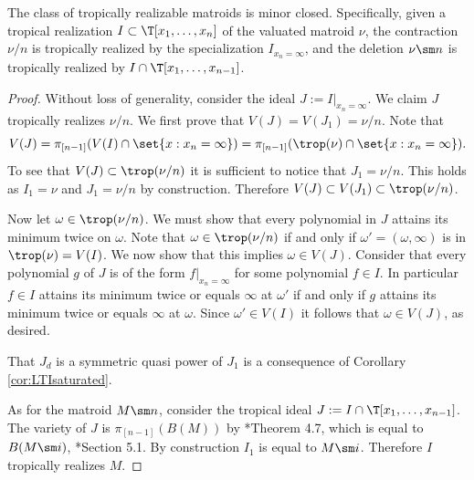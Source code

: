 \begin{theorem}\label{thm:minorClosed}
The class of tropically realizable matroids is minor closed. Specifically, given a tropical realization $I\subset \T[x_1,\dots,x_n]$ of the valuated matroid $\nu$, the contraction $\nu/n$ is tropically realized by the specialization $I_{x_n=\infty}$, and the deletion $\nu\sm n$ is tropically realized by $I\cap\T[x_1,\dots,x_{n-1}]$.
\end{theorem}
\begin{proof}
Without loss of generality, consider the ideal $J:= I|_{x_n=\infty}$. We claim $J$ tropically realizes $\nu/n$. We first prove that $V(J) = V(J_1)=\nu/n$. Note that
$$V(J)= \pi_{[n-1]}(V(I)\cap \set{x: x_n = \infty}) = \pi_{[n-1]}(\trop(\nu)\cap\set{x: x_n=\infty}).$$
To see that $V(J)\subset \trop(\nu/n)$ it is sufficient to notice that $J_1 = \nu/n$. This holds as $I_1=\nu$ and $J_1=\nu/n$ by construction. Therefore $V(J)\subset V(J_1)\subset \trop(\nu/n)$. 

Now let $\omega\in \trop(\nu/n)$. We must show that every polynomial in $J$ attains its minimum twice on $\omega$. Note that $\omega\in \trop(\nu/n)$ if and only if $\omega'=(\omega,\infty)$ is in $\trop(\nu)=V(I)$. We now show that this implies $\omega\in V(J)$. Consider that every polynomial $g$ of $J$ is of the form $f|_{x_n=\infty}$ for some polynomial $f\in I$. In particular $f\in I$ attains its minimum twice or equals $\infty$ at $\omega'$ if and only if $g$ attains its minimum twice or equals $\infty$ at $\omega$. Since $\omega'\in V(I)$ it follows that $\omega\in V(J)$, as desired. 

That $J_d$ is a symmetric quasi power of $J_1$ is a consequence of Corollary \ref{cor:LTIsaturated}.

As for the matroid $M\sm n$, consider the tropical ideal $J := I\cap \T[x_1,\dots,x_{n-1}]$. The variety of $J$ is $\pi_{[n-1]}(B(M))$ by \cite{MR20}*{Theorem 4.7}, which is equal to $B(M\sm i)$, \cite{dMRS20}*{Section 5.1}. By construction $I_1$ is equal to $M\sm i$. Therefore $I$ tropically realizes $M$. 
\end{proof}


